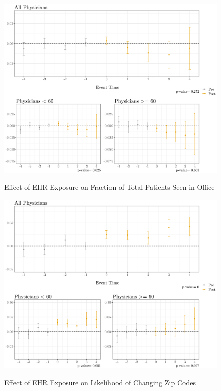 \documentclass[11pt]{article}
\begin{document}
\begin{figure}[p]
    \centering
    \caption{Effect of EHR Exposure on Fraction of Total Patients Seen in Office}
    \includegraphics[scale=.4]{Objects/officefrac_plot.pdf}
    \label{fig:officesecond}
\end{figure}

\begin{figure}[p]
    \centering
    \caption{Effect of EHR Exposure on Likelihood of Changing Zip Codes}
    \includegraphics[scale=.4]{Objects/zip_plot.pdf}
    \label{fig:zip}
\end{figure}
\end{document}
